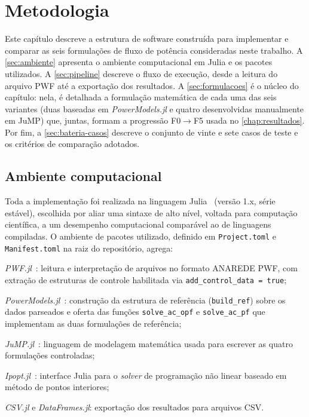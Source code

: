\chapter{Metodologia}
\label{chap:metodologia}

Este capítulo descreve a estrutura de software construída para implementar e comparar as seis formulações de fluxo de potência consideradas neste trabalho. A \autoref{sec:ambiente} apresenta o ambiente computacional em Julia e os pacotes utilizados. A \autoref{sec:pipeline} descreve o fluxo de execução, desde a leitura do arquivo PWF até a exportação dos resultados. A \autoref{sec:formulacoes} é o núcleo do capítulo: nela, é detalhada a formulação matemática de cada uma das seis variantes (duas baseadas em \textit{PowerModels.jl} e quatro desenvolvidas manualmente em JuMP) que, juntas, formam a progressão F0$\rightarrow$F5 usada no \autoref{chap:resultados}. Por fim, a \autoref{sec:bateria-casos} descreve o conjunto de vinte e sete casos de teste e os critérios de comparação adotados.

\section{Ambiente computacional}
\label{sec:ambiente}

Toda a implementação foi realizada na linguagem Julia~\cite{bezanson2017julia} (versão 1.x, série estável), escolhida por aliar uma sintaxe de alto nível, voltada para computação científica, a um desempenho computacional comparável ao de linguagens compiladas. O ambiente de pacotes utilizado, definido em \texttt{Project.toml} e \texttt{Manifest.toml} na raiz do repositório, agrega:

\begin{alineascomponto}
    \item \textit{PWF.jl}~\cite{pwfjl}: leitura e interpretação de arquivos no formato ANAREDE PWF, com extração de estruturas de controle habilitada via \texttt{add\_control\_data = true};
    \item \textit{PowerModels.jl}~\cite{coffrin2018powermodels}: construção da estrutura de referência (\texttt{build\_ref}) sobre os dados parseados e oferta das funções \texttt{solve\_ac\_opf} e \texttt{solve\_ac\_pf} que implementam as duas formulações de referência;
    \item \textit{JuMP.jl}~\cite{lubin2023jump}: linguagem de modelagem matemática usada para escrever as quatro formulações controladas;
    \item \textit{Ipopt.jl}~\cite{wachterBiegler2006ipopt}: interface Julia para o \textit{solver} de programação não linear baseado em método de pontos interiores;
    \item \textit{CSV.jl} e \textit{DataFrames.jl}: exportação dos resultados para arquivos CSV.
\end{alineascomponto}

